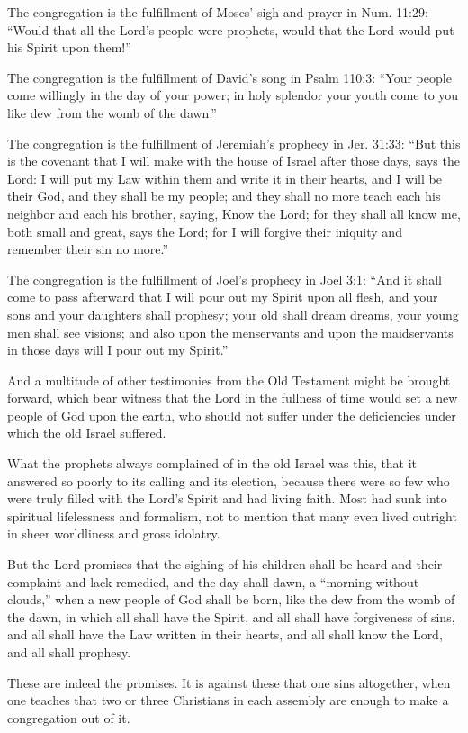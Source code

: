 The congregation is the fulfillment of Moses’ sigh and prayer in Num. 11:29: “Would that all the Lord’s people were prophets, would that the Lord would put his Spirit upon them!”

The congregation is the fulfillment of David’s song in Psalm 110:3: “Your people come willingly in the day of your power; in holy splendor your youth come to you like dew from the womb of the dawn.”

The congregation is the fulfillment of Jeremiah’s prophecy in Jer. 31:33: “But this is the covenant that I will make with the house of Israel after those days, says the Lord: I will put my Law within them and write it in their hearts, and I will be their God, and they shall be my people; and they shall no more teach each his neighbor and each his brother, saying, Know the Lord; for they shall all know me, both small and great, says the Lord; for I will forgive their iniquity and remember their sin no more.”

The congregation is the fulfillment of Joel’s prophecy in Joel 3:1: “And it shall come to pass afterward that I will pour out my Spirit upon all flesh, and your sons and your daughters shall prophesy; your old shall dream dreams, your young men shall see visions; and also upon the menservants and upon the maidservants in those days will I pour out my Spirit.”

And a multitude of other testimonies from the Old Testament might be brought forward, which bear witness that the Lord in the fullness of time would set a new people of God upon the earth, who should not suffer under the deficiencies under which the old Israel suffered.

What the prophets always complained of in the old Israel was this, that it answered so poorly to its calling and its election, because there were so few who were truly filled with the Lord’s Spirit and had living faith. Most had sunk into spiritual lifelessness and formalism, not to mention that many even lived outright in sheer worldliness and gross idolatry.

But the Lord promises that the sighing of his children shall be heard and their complaint and lack remedied, and the day shall dawn, a “morning without clouds,” when a new people of God shall be born, like the dew from the womb of the dawn, in which all shall have the Spirit, and all shall have forgiveness of sins, and all shall have the Law written in their hearts, and all shall know the Lord, and all shall prophesy.

These are indeed the promises. It is against these that one sins altogether, when one teaches that two or three Christians in each assembly are enough to make a congregation out of it.

